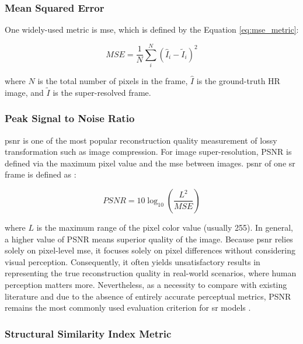 \documentclass[conference]{IEEEtran}
\begin{document}
\subsubsection{Mean Squared Error}

One widely-used metric is \acrfull{mse}, which is defined by the Equation \ref{eq:mse_metric}:

\begin{equation} \label{eq:mse_metric}
    MSE = \frac{1}{N} \sum_{i}^{N} (\hat{I}_i - \tilde{I}_i)^2
\end{equation}

where $N$ is the total number of pixels in the frame, $\hat{I}$ is the ground-truth HR image, and $\tilde{I}$ is the super-resolved frame.

\subsubsection{Peak Signal to Noise Ratio}

\Acrfull{psnr} is one of the most popular reconstruction quality measurement of lossy transformation such as image compression. For image
super-resolution, PSNR is defined via the maximum pixel value and the \acrshort{mse} between images. \Acrshort{psnr} of one \acrshort{sr} frame is defined as \cite{video_super_resolution_survey_2020}:

\begin{equation}  \label{eq:psnr_metric}
    PSNR = 10 \log_{10} (\frac{L^2}{MSE})
\end{equation}

where $L$ is the maximum range of the pixel color value (usually 255). In general, a higher value of PSNR means superior quality of the image. Because \acrshort{psnr} relies solely on pixel-level \acrshort{mse}, it focuses solely on pixel differences without considering visual perception. Consequently, it often yields unsatisfactory results in representing the true reconstruction quality in real-world scenarios, where human perception matters more. Nevertheless, as a necessity to compare with existing literature and due to the absence of entirely accurate perceptual metrics, PSNR remains the most commonly used evaluation criterion for \acrshort{sr} models \cite{deep_learning_image_sr_2020}.

\subsubsection{Structural Similarity Index Metric}
\end{document}
